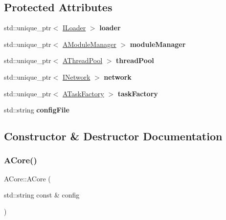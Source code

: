 \subsection*{Protected Attributes}
\begin{DoxyCompactItemize}
\item 
\mbox{\label{classxzia_1_1ACore_ae22e66acfe4f3257eb10019fa21a56f2}} 
std\+::unique\+\_\+ptr$<$ \mbox{\hyperlink{classxzia_1_1ILoader}{I\+Loader}} $>$ {\bfseries loader}
\item 
\mbox{\label{classxzia_1_1ACore_a1168c0799674e15ef09c100d0aaaa0bb}} 
std\+::unique\+\_\+ptr$<$ \mbox{\hyperlink{classxzia_1_1AModuleManager}{A\+Module\+Manager}} $>$ {\bfseries module\+Manager}
\item 
\mbox{\label{classxzia_1_1ACore_aa1388a6e0bf6f19a6d59d63145b9fc36}} 
std\+::unique\+\_\+ptr$<$ \mbox{\hyperlink{classxzia_1_1AThreadPool}{A\+Thread\+Pool}} $>$ {\bfseries thread\+Pool}
\item 
\mbox{\label{classxzia_1_1ACore_a096cbf3ea8cc7a9eb2856f14ad3d9c87}} 
std\+::unique\+\_\+ptr$<$ \mbox{\hyperlink{classxzia_1_1INetwork}{I\+Network}} $>$ {\bfseries network}
\item 
\mbox{\label{classxzia_1_1ACore_a2d03c49c10d23d220c60bf8d098d30ac}} 
std\+::unique\+\_\+ptr$<$ \mbox{\hyperlink{classxzia_1_1ATaskFactory}{A\+Task\+Factory}} $>$ {\bfseries task\+Factory}
\item 
\mbox{\label{classxzia_1_1ACore_a079015b2ad82d2f5eb918589421c26c8}} 
std\+::string {\bfseries config\+File}
\end{DoxyCompactItemize}


\subsection{Constructor \& Destructor Documentation}
\mbox{\label{classxzia_1_1ACore_a615436a95f788dd92d545e10a1d4b2c3}} 
\subsubsection{\texorpdfstring{A\+Core()}{ACore()}}
{\footnotesize\ttfamily A\+Core\+::\+A\+Core (\begin{DoxyParamCaption}\item[{std\+::string const \&}]{config }\end{DoxyParamCaption})\hspace{0.3cm}{\ttfamily [explicit]}}



